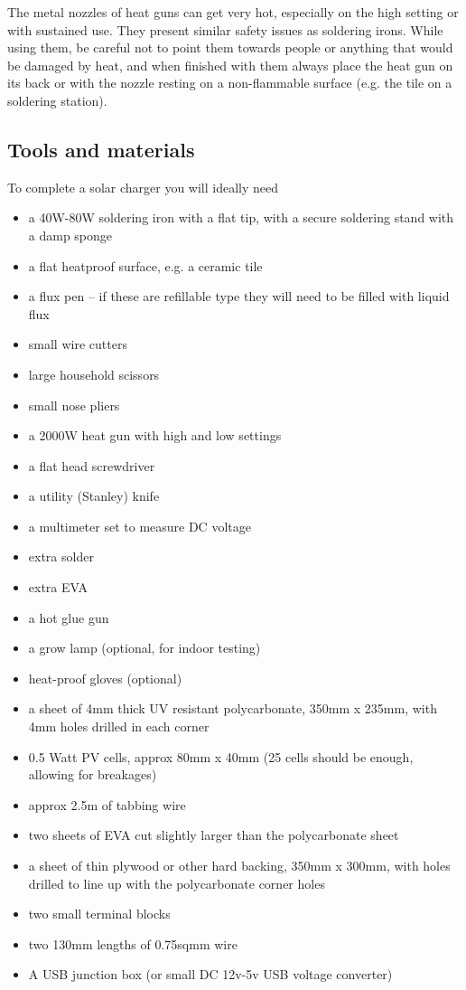 \documentclass{article}
\theoremstyle{definition}
\theoremstyle{definition}
\theoremstyle{remark}
\begin{document}
    The metal nozzles of heat guns can get very hot, especially on the high setting or with sustained use. They present similar safety issues as soldering irons. While using them, be careful not to point them towards people or anything that would be damaged by heat, and when finished with them always place the heat gun on its back or with the nozzle resting on a non-flammable surface (e.g. the tile on a soldering station).
  

  {\color{blue}\subsection{Tools and materials}} %
  \label{sub:tools_and_materials}

    To complete a solar charger you will ideally need

    \begin{itemize}
      \item a 40W-80W soldering iron with a flat tip, with a secure soldering stand with a damp sponge 
      \item a flat heatproof surface, e.g. a ceramic tile
      \item a flux pen – if these are refillable type they will need to be filled with liquid flux
      \item small wire cutters
      \item large household scissors
      \item small nose pliers
      \item a 2000W heat gun with high and low settings
      \item a flat head screwdriver
      \item a utility (Stanley) knife
      \item a multimeter set to measure DC voltage
      \item extra solder
      \item extra EVA
      \item a hot glue gun
      \item a grow lamp (optional, for indoor testing)
      \item heat-proof gloves (optional)
      \item a sheet of 4mm thick UV resistant polycarbonate, 350mm x 235mm, with 4mm holes drilled in each corner
      \item 0.5 Watt PV cells, approx 80mm x 40mm (25 cells should be enough, allowing for breakages)
      \item approx 2.5m of tabbing wire
      \item two sheets of EVA cut slightly larger than the polycarbonate sheet
      \item a sheet of thin plywood or other hard backing, 350mm x 300mm, with holes drilled to line up with the polycarbonate corner holes
      \item two small terminal blocks
      \item two 130mm lengths of 0.75sqmm wire
      \item A USB junction box (or small DC 12v-5v USB voltage converter)
    \end{itemize}
\end{document}
